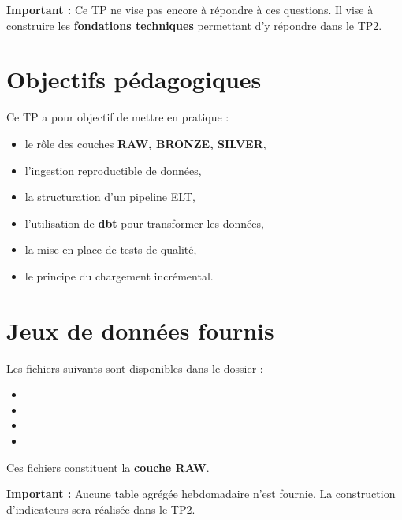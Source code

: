 \documentclass[11pt,a4paper]{article}
\begin{document}
\textbf{Important :}
Ce TP ne vise pas encore à répondre à ces questions.
Il vise à construire les \textbf{fondations techniques} permettant d’y répondre dans le TP2.


\section*{Objectifs pédagogiques}

Ce TP a pour objectif de mettre en pratique :

\begin{itemize}
  \item le rôle des couches \textbf{RAW, BRONZE, SILVER},
  \item l’ingestion reproductible de données,
  \item la structuration d’un pipeline ELT,
  \item l’utilisation de \textbf{dbt} pour transformer les données,
  \item la mise en place de tests de qualité,
  \item le principe du chargement incrémental.
\end{itemize}


\section*{Jeux de données fournis}

Les fichiers suivants sont disponibles dans le dossier  :

\begin{itemize}
  \item {}
  \item {}
  \item {}
  \item {}
\end{itemize}

Ces fichiers constituent la \textbf{couche RAW}.

\bigskip

\textbf{Important :}
Aucune table agrégée hebdomadaire n’est fournie.
La construction d’indicateurs sera réalisée dans le TP2.

\end{document}
